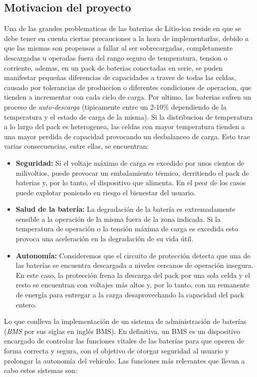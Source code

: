 \documentclass[10pt,a4paper]{article}
\begin{document}
\subsection{Motivacion del proyecto}

\noindent Una de las grandes problematicas de las baterias de Litio-ion 
reside en que se debe tener en cuenta ciertas precauciones a la hora de
implementarlas, debido a que las mismas son propensas a fallar al ser 
sobrecargadas, completamente descargadas u operadas fuera del
rango seguro de temperatura, tension o corriente, ademas, en un pack de 
baterias conectadas en serie, se puden manifestar pequeñas diferencias de 
capacidades a traves de todas las celdas, causado por tolerancias de
produccion o diferentes condiciones de operacion, que tienden
a incrementar con cada ciclo de carga. Por ultimo, las baterias
sufren un proceso de \emph{auto-descarga} (tipicamente entre un
2-10\% dependiendo de la temperatura y el estado de carga de la misma). 
Si la distribucion de temperatura a lo largo del pack es
heterogenea, las celdas con mayor temperatura tienden a una mayor
perdida de capacidad provocando un desbalanceo de carga.
Esto trae varias consecuencias, entre ellas, se encuentran:

\begin{itemize}
    \item \textbf{Seguridad:} Si el voltaje máximo de carga es excedido por 
	unos cientos de milivoltios, puede provocar un embalamiento térmico, 
	derritiendo el pack de baterias y, por lo tanto, el dispositivo que 
	alimenta. En el peor de los casos puede explotar poniendo en riesgo el 
	bienestar del usuario.
    \item \textbf{Salud de la batería:} La degradación de la batería es 
	extremadamente sensible a la operación de la misma fuera de la zona 
	indicada. Si la temperatura de operación o la tensión máxima de carga 
	es excedida esto provoca una aceleración en la degradación de su vida 
	útil.
    \item \textbf{Autonomía:} Consideremos que el circuito de protección 
	detecta que una de las baterías se encuentra descargada a niveles 
	cercanos de operación insegura. En este caso, la protección frena la 
	descarga del pack por una sola celda y el resto se encuentran con 
	voltajes más altos y, por lo tanto, con un remanente de energía para 
	entregar a la carga desaprovechando la capacidad del pack entero.
\end{itemize}

\noindent Lo que conlleva la implementación de un sistema de administración 
de baterías (\emph{\acrshort{BMS}} por sus siglas en inglés \acrlong{BMS}). En
definitiva, un \acrshort{BMS} es un dispositivo encargado de controlar las
funciones vitales de las baterías para que operen de forma correcta y segura, 
con el objetivo de otorgar seguridad al usuario y prolongar la autonomía del 
vehículo. Las funciones más relevantes que llevan a cabo estos sistemas son:
\end{document}
